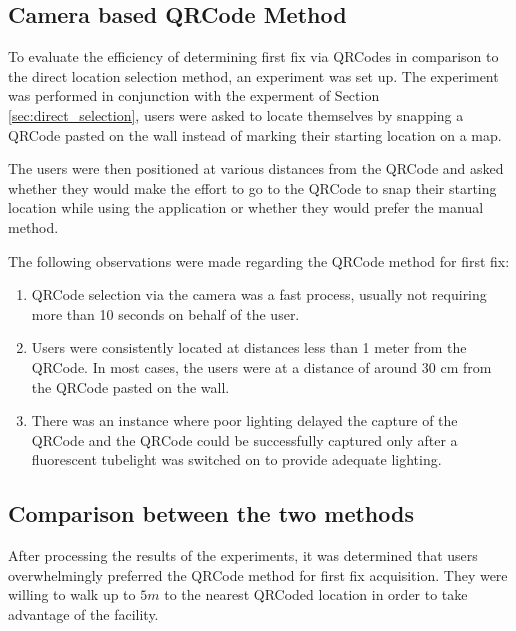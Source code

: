 
\subsection{Camera based QRCode Method \label{sec:qrcode_selection}}

To evaluate the efficiency of determining first fix via QRCodes in comparison 
to the direct location selection method, an experiment was set up. 
The experiment was performed in conjunction with the experment of 
Section \ref{sec:direct_selection}, users were asked to locate themselves
by snapping a QRCode pasted on the wall instead of marking their starting 
location on a map.

The users were then positioned at various distances from the QRCode and 
asked whether they would make the effort to go to the QRCode to snap their
starting location while using the application or whether they would prefer
the manual method.

The following observations were made regarding the QRCode method for first
fix:

\begin{enumerate}
\item QRCode selection via the camera was a fast process, usually not requiring
    more than 10 seconds on behalf of the user.
\item Users were consistently located at distances less than 1 meter from 
    the QRCode. In most cases, the users were at a distance of around 30 cm 
    from the QRCode pasted on the wall. 
\item There was an instance where poor lighting delayed the capture of the
    QRCode and the QRCode could be successfully captured only after a 
    fluorescent tubelight was switched on to provide adequate lighting.
\end{enumerate}


\subsection{Comparison between the two methods}

After processing the results of the experiments, it was determined that 
users overwhelmingly preferred the QRCode method for first fix acquisition.
They were willing to walk up to $5 m$ to the nearest QRCoded location in 
order to take advantage of the facility.

